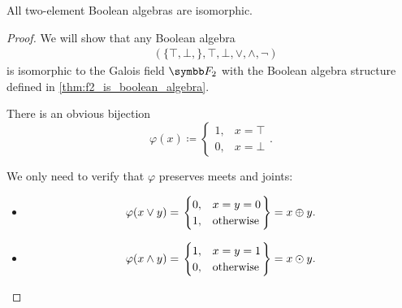 \begin{proposition}\label{thm:binary_boolean_algebras_are_isomorphic}
  All two-element Boolean algebras are isomorphic.
\end{proposition}
\begin{proof}
  We will show that any Boolean algebra
  \begin{align*}
    &(\{ \top, \bot, \}, \top, \bot, \lor, \land, \neg)
  \end{align*}
  is isomorphic to the Galois field \( \Fld_2 \) with the Boolean algebra structure defined in \cref{thm:f2_is_boolean_algebra}.

  There is an obvious bijection
  \begin{equation*}
    \varphi(x) \coloneqq \begin{cases}
      1, &x = \top \\
      0, &x = \bot
    \end{cases}.
  \end{equation*}

  We only need to verify that \( \varphi \) preserves meets and joints:
  \begin{itemize}
    \item \begin{equation*}
      \varphi(x \lor y)
      =
      \begin{rcases}
        \begin{cases}
          0, &x = y = 0 \\
          1, &\text{otherwise}
        \end{cases}
      \end{rcases}
      =
      x \oplus y.
    \end{equation*}

    \item \begin{equation*}
      \varphi(x \land y)
      =
      \begin{rcases}
        \begin{cases}
          1, &x = y = 1 \\
          0, &\text{otherwise}
        \end{cases}
      \end{rcases}
      =
      x \odot y.
    \end{equation*}
  \end{itemize}
\end{proof}
